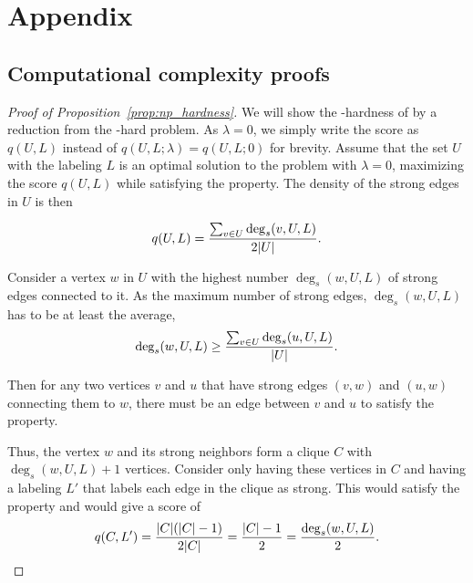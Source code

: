
\appendix
\section{Appendix}


\subsection{Computational complexity proofs}
\label{appendix:complexity}
\begin{proof}[Proof of Proposition~\ref{prop:np_hardness}]
We will show the \np-hardness of \prbstrwk by a reduction from the \np-hard \prbmaxclique problem. As $\lambda=0$, we simply write the score as $q(U, L)$ instead of $q(U, L; \lambda) = q(U, L; 0)$ for brevity. Assume that the set $U$ with the labeling $L$ is an optimal solution to the \prbstrwk problem with $\lambda = 0$, maximizing the score $q(U, L)$ while satisfying the \stc property. 
The density of the strong edges in $U$ is then

\begin{equation}
\label{equation:strong_density}
q(U, L) = \frac{\sum_{v \in U} \deg_s(v, U, L)}{2{\left|U\right|}}.
\end{equation}

Consider a vertex $w$ in $U$ with the highest number $\deg_s(w, U, L)$ of strong edges connected to it. As the maximum number of strong edges, $\deg_s(w, U, L)$ has to be at least the average, 
\begin{equation}
\label{equation:average_degree}
\deg_s(w, U, L) \geq \frac{\sum_{v \in U} \deg_s(u, U, L)}{{\left|U\right|}}.
\end{equation}

Then for any two vertices $v$ and $u$ that have strong edges $(v,w)$ and $(u,w)$ connecting them to $w$, there must be an edge between $v$ and $u$ to satisfy the \stc property.

Thus, the vertex $w$ and its strong neighbors form a clique $C$ with $\deg_s(w, U, L)+1$ vertices.
Consider only having these vertices in $C$ and having a labeling $L'$ that labels each edge in the clique as strong. This would satisfy the \stc property and would give a score of 
\begin{equation*}
q(C, L') = \frac{{\left|C\right|}({\left|C\right|}-1)}{2{\left|C\right|}} = \frac{{\left|C\right|}-1}{2} = \frac{\deg_s(w, U, L)}{2} .
\end{equation*}


\end{proof}
